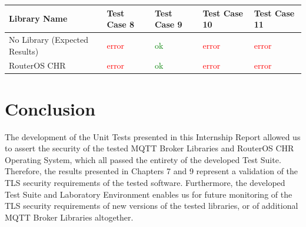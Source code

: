 \documentclass[binding=0.6cm,noexaminfo]{sapthesis}
\begin{document}
\begin{flushleft}
\begin{tabular}{| p{2cm} | p{1.5cm} | p{1.5cm} | p{1.5cm} | p{1.5cm} |}
\hline
\bf Library Name & \bf Test Case 8 & \bf Test Case 9 & \bf Test Case 10 & \bf Test Case 11 \\
\hline
No Library (Expected Results) & \textcolor{red}{error} & \textcolor{green}{ok} & \textcolor{red}{error} & \textcolor{red}{error} \\
\hline
RouterOS CHR & \textcolor{red}{error} & \textcolor{green}{ok} & \textcolor{red}{error} & \textcolor{red}{error} \\
\hline
\end{tabular}
\end{flushleft}

\chapter{Conclusion}
The development of the Unit Tests presented in this Internship Report allowed us to assert the security of the tested MQTT Broker Libraries and RouterOS CHR Operating System, which all passed the entirety of the developed Test Suite. Therefore, the results presented in Chapters 7 and 9 represent a validation of the TLS security requirements of the tested software.
Furthermore, the developed Test Suite and Laboratory Environment enables us for future monitoring of the TLS security requirements of new versions of the tested libraries, or of additional MQTT Broker Libraries altogether.

\backmatter
\cleardoublepage
{} %

\printbibliography
\end{document}
